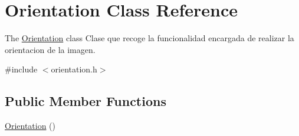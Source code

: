 \hypertarget{class_orientation}{\section{Orientation Class Reference}
\label{class_orientation}
}


The \hyperlink{class_orientation}{Orientation} class Clase que recoge la funcionalidad encargada de realizar la orientacion de la imagen.  




{\ttfamily \#include $<$orientation.\+h$>$}

\subsection*{Public Member Functions}
\begin{DoxyCompactItemize}
\item 
\hypertarget{class_orientation_afa8e101af342cdf57d5e33109ffc6529}{\hyperlink{class_orientation_afa8e101af342cdf57d5e33109ffc6529}{Orientation} ()}\label{class_orientation_afa8e101af342cdf57d5e33109ffc6529}


\end{DoxyCompactItemize}
